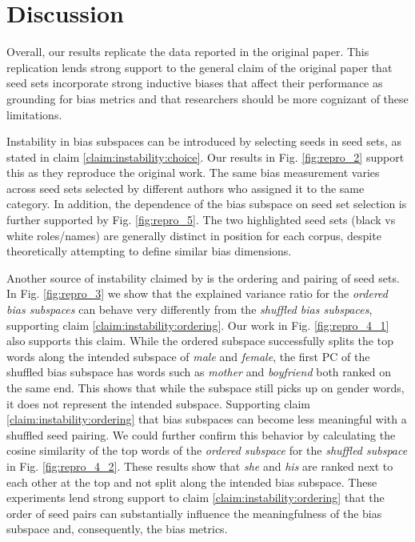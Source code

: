 \section{Discussion}

Overall, our results replicate the data reported in the original paper. This replication lends
strong support to the general claim of the original paper that seed sets incorporate strong
inductive biases that affect their performance as grounding for bias metrics and that researchers
should be more cognizant of these limitations.

Instability in bias subspaces can be introduced by selecting seeds in seed sets, as stated in claim
\ref{claim:instability:choice}. Our results in Fig. \ref{fig:repro_2} support this as they reproduce
the original work. The same bias measurement varies across seed sets selected by different authors
who assigned it to the same category. In addition, the dependence of the bias subspace on seed set
selection is further supported by Fig. \ref{fig:repro_5}. The two highlighted seed sets (black vs
white roles/names) are generally distinct in position for each corpus, despite theoretically
attempting to define similar bias dimensions.

Another source of instability claimed by \citet{antoniak-mimno-2021-bad} is the ordering and pairing
of seed sets. In Fig. \ref{fig:repro_3} we show that the explained variance ratio for the
\textit{ordered bias subspaces} can behave very differently from the \textit{shuffled bias
	subspaces}, supporting claim \ref{claim:instability:ordering}. Our work in Fig. \ref{fig:repro_4_1}
also supports this claim. While the ordered subspace successfully splits the top words along the
intended subspace of \textit{male} and \textit{female}, the first PC of the shuffled bias subspace
has words such as \textit{mother} and \textit{boyfriend} both ranked on the same end. This shows
that while the subspace still picks up on gender words, it does not represent the intended subspace.
Supporting claim \ref{claim:instability:ordering} that bias subspaces can become less meaningful
with a shuffled seed pairing. We could further confirm this behavior by calculating the cosine
similarity of the top words of the \textit{ordered subspace} for the \textit{shuffled subspace} in
Fig. \ref{fig:repro_4_2}. These results show that \textit{she} and \textit{his} are ranked next to
each other at the top and not split along the intended bias subspace. These experiments lend strong
support to claim \ref{claim:instability:ordering} that the order of seed pairs can substantially
influence the meaningfulness of the bias subspace and, consequently, the bias metrics.

